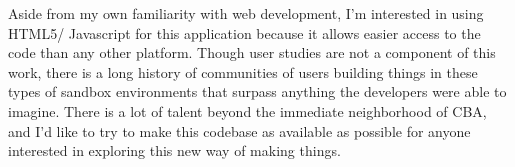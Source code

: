 {Aside from my own familiarity with web development, I'm interested in using HTML5/ Javascript for this application because it allows easier access to the code than any other platform.  Though user studies are not a component of this work, there is a long history of communities of users building things in these types of sandbox environments that surpass anything the developers were able to imagine.  There is a lot of talent beyond the immediate neighborhood of CBA, and I'd like to try to make this codebase as available as possible for anyone interested in exploring this new way of making things.

%
%
%

%
%
%
%

%
%
%

}
